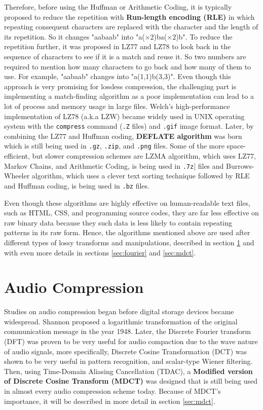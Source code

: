 Therefore, before using the Huffman or Arithmetic Coding, it is typically proposed to reduce the  repetition with \textbf{Run-length encoding (RLE)} in which repeating consequent characters are replaced with the character and the length of its repetition\cite{RLE}. So it changes "aabaab" into "a($\times 2$)ba($\times 2$)b". To reduce the repetition further, it was proposed in LZ77 and LZ78 to look back in the sequence of characters to see if it is a match and reuse it\cite{LZ77, LZ78}. So two numbers are required to mention how many characters to go back and how many of them to use. For example, "aabaab" changes into "a(1,1)b(3,3)". Even though this approach is very promising for lossless compression, the challenging part is implementing a match-finding algorithm as a poor implementation can lead to a lot of process and memory usage in large files. Welch's high-performance implementation of LZ78 (a.k.a LZW) became widely used in UNIX operating system with the \verb|compress| command (\verb|.Z| files) and \verb|.gif| image format\cite{LZW}. Later, by combining the LZ77 and Huffman coding, \textbf{DEFLATE algorithm} was born which is still being used in \verb|.gz|, \verb|.zip|, and \verb|.png| files\cite{Deutsch1996rfc1951}. Some of the more space-efficient, but slower compression schemes are LZMA algorithm, which uses LZ77, Markov Chains, and Arithmetic Coding\cite{igor_pavlov_1998_lzma}, is being used in \verb|.7z|| files and Burrows-Wheeler algorithm, which uses a clever text sorting technique followed by RLE and Huffman coding\cite{burrows1994block}, is being used in \verb|.bz| files.

Even though these algorithms are highly effective on human-readable text files, such as HTML, CSS, and programming source codes, they are far less  effective on raw binary data because they such data is less likely to contain repeating patterns in its raw form. Hence, the algorithms mentioned above are used after different types of lossy transforms and manipulations, described in section \ref{sec:audio-compression} and with even more details in sections \ref{sec:fourier} and \ref{sec:mdct}.

\section{Audio Compression}
\label{sec:audio-compression}

Studies on audio compression began before digital storage devices became widespread. Shannon proposed a logarithmic transformation of the original communication message in the year 1948\cite{Shannon1948Bell}. Later, the Discrete Fourier transform (DFT) was proven to be very useful for audio compaction due to the wave nature of audio signals, more specifically, Discrete Cosine Transformation (DCT) was shown to be very useful in pattern recognition, and scalar-type Wiener filtering\cite{Ahmed1974DCT}. Then, using Time-Domain Aliasing Cancellation (TDAC), a \textbf{Modified version of Discrete Cosine Transform (MDCT)} was designed that is still being used in almost every audio compression scheme today\cite{Princen1986TDAC}. Because of MDCT's importance, it will be described in more detail in section \ref{sec:mdct}.


